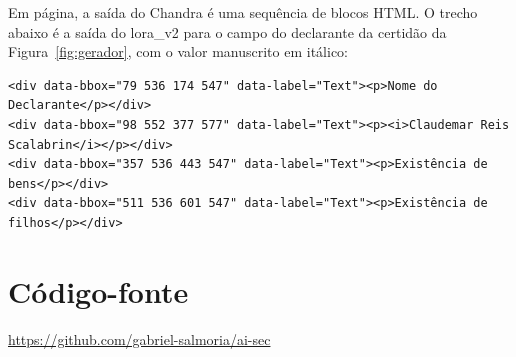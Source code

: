 Em página, a saída do Chandra é uma sequência de blocos HTML. O trecho abaixo é a saída do lora\_v2 para o campo do declarante da certidão da Figura~\ref{fig:gerador}, com o valor manuscrito em itálico:

{\scriptsize
\begin{verbatim}
<div data-bbox="79 536 174 547" data-label="Text"><p>Nome do Declarante</p></div>
<div data-bbox="98 552 377 577" data-label="Text"><p><i>Claudemar Reis Scalabrin</i></p></div>
<div data-bbox="357 536 443 547" data-label="Text"><p>Existência de bens</p></div>
<div data-bbox="511 536 601 547" data-label="Text"><p>Existência de filhos</p></div>
\end{verbatim}
}

\section{Código-fonte}
\label{app:codigo}

\url{https://github.com/gabriel-salmoria/ai-sec}
